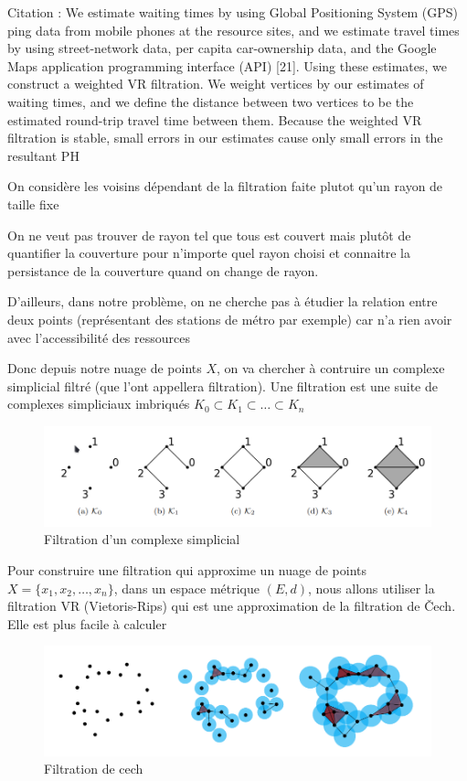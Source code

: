 \documentclass{article}
\begin{document}
Citation : We estimate waiting times by using
Global Positioning System (GPS) ping data from mobile phones at the resource sites,
and we estimate travel times by using street-network data, per capita car-ownership
data, and the Google Maps application programming interface (API) [21]. Using these
estimates, we construct a weighted VR filtration. We weight vertices by our estimates
of waiting times, and we define the distance between two vertices to be the estimated
round-trip travel time between them. Because the weighted VR filtration is stable,
small errors in our estimates cause only small errors in the resultant PH

On considère les voisins dépendant de la filtration faite plutot qu'un rayon de taille fixe

On ne veut pas trouver de rayon tel que tous est couvert mais plutôt de quantifier
la couverture pour n'importe quel rayon choisi et connaitre la persistance de la
couverture quand on change de rayon.

D'ailleurs, dans notre problème, on ne cherche pas à étudier la relation entre
deux points (représentant des stations de métro par exemple) car n'a rien avoir 
avec l'accessibilité des ressources

Donc depuis notre nuage de points $X$, on va chercher à contruire un complexe
simplicial filtré (que l'ont appellera filtration). Une filtration est une 
suite de complexes simpliciaux imbriqués $K_0 \subset K_1 \subset \dots \subset K_n$

\begin{figure}[h!]
    \centering
    \includegraphics[width=1\textwidth]{images/Filtration ex.png}
    \caption{Filtration d'un complexe simplicial}
\end{figure}

Pour construire une filtration qui approxime un nuage de points $X = \{x_1, x_2, \dots, x_n\}$,
dans un espace métrique $(E, d)$, nous allons utiliser la filtration VR (Vietoris-Rips)
qui est une approximation de la filtration de Čech. Elle est plus facile à 
calculer

\begin{figure}[h!]
    \centering
    \includegraphics[width=1\textwidth]{images/cech.png}
    \caption{Filtration de cech}
\end{figure}
\end{document}
